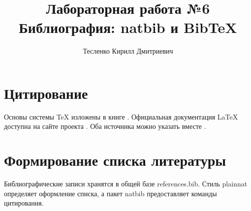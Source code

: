 \documentclass[a4paper,12pt]{article}
\title{Лабораторная работа №6\\Библиография: natbib и BibTeX}
\author{Тесленко Кирилл Дмитриевич}
\date{}
\begin{document}
\maketitle
\section{Цитирование}
Основы системы TeX изложены в книге \citet{knuth1984texbook}.
Официальная документация LaTeX доступна на сайте проекта \citep{latexproject}.
Оба источника можно указать вместе \citep{knuth1984texbook,latexproject}.

\section{Формирование списка литературы}
Библиографические записи хранятся в общей базе references.bib.
Стиль plainnat определяет оформление списка, а пакет natbib предоставляет команды цитирования.


\end{document}
